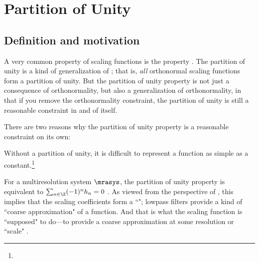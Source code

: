 


\chapter{Partition of Unity}
\label{chp:pounity}

\section{Definition and motivation}

A very common property of scaling functions  is the  property .
The partition of unity is a kind of generalization of ;
that is, \emph{all} orthonormal scaling functions form a partition of unity.
But the partition of unity property is not just a consequence of orthonormality, but
also a generalization of orthonormality, in that if you remove the
orthonormality constraint, the partition of unity is still a
reasonable constraint in and of itself.

There are two reasons why the partition of unity property is a reasonable
constraint on its own:
\begin{liste}
   \item Without a partition of unity, it is difficult to represent a function as simple as a
         constant.\footnote{}

  \item For a multiresolution system $\mrasys$, the partition of unity property is equivalent to
        $\sum_{n\in\Z} (-1)^n h_n = 0$ .
        As viewed from the perspective of  ,
        this implies that the scaling coefficients form a ``"; 
        lowpass filters provide a kind of ``coarse approximation"
        of a function. And that is what the scaling function is ``supposed" to do---to provide a coarse approximation 
        at some resolution or ``scale" .
\end{liste}

